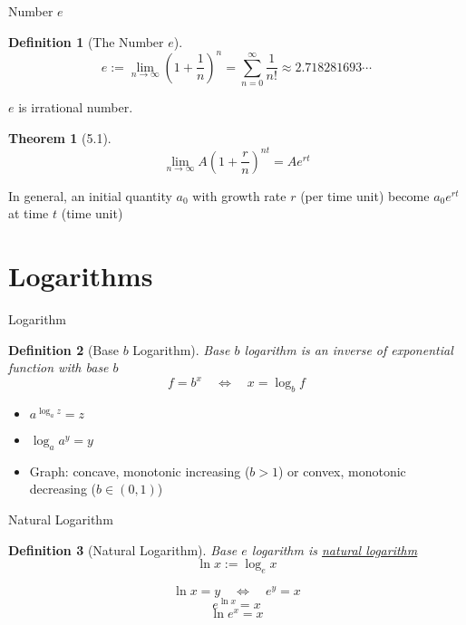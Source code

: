 \documentclass[final]{beamer}
\newtheorem{defn}{Definition}
\newtheorem{thm}{Theorem}
\begin{document}
\begin{frame}[t]{Number $e$}
	\begin{defn}
		[The Number $e$]
		\[
			e:=\lim_{n\rightarrow \infty}\left(1+\frac 1 n \right)^n = \sum_{n=0}^\infty \frac 1 {n!} \approx 2.718281693\cdots
		\]
	\end{defn}
	
	$e$ is irrational number.
	
	\begin{thm}
		[5.1]\[
			\lim_{n\rightarrow\infty}A\left(1+\frac r n \right)^{nt} = Ae^{rt}
		\]
	\end{thm}
	In general, an initial quantity $a_0$ with growth rate $r$ (per time unit) become $a_0 e^{rt}$ at time $t$ (time unit)
\end{frame}

\section{Logarithms} %
\label{sec:logarithms}

\begin{frame}[t]{Logarithm}
	\begin{defn}
		[Base $b$ Logarithm]
		Base $b$ logarithm is an inverse of exponential function with base $b$
		\[
			f = b^x  \quad\Leftrightarrow\quad x = \log_b f
		\]
	\end{defn}

		\begin{itemize}
			\item $a^{\log_a z}=z$
			\item $\log_a{a^y}=y$
			\item Graph: concave, monotonic increasing ($b>1$) or convex, monotonic decreasing ($b\in(0,1)$)
		\end{itemize}
\end{frame}

\begin{frame}[t]{Natural Logarithm}
	\begin{defn}
		[Natural Logarithm]
		Base $e$ logarithm is \uline{natural logarithm}\[
			\ln x := \log_e x
		\]
	\end{defn}
	\[
		\ln x = y \quad \Leftrightarrow \quad e^y = x
	\]\[
		e^{\ln x} = x 
	\]\[
		\ln e^x = x
	\]
\end{frame}

	
\end{document}
